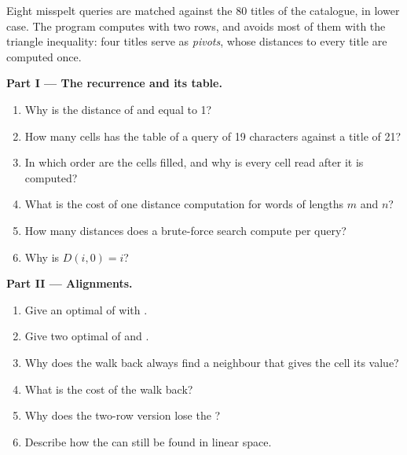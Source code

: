 \begin{problem}\label{pb:b1:dynamic-programming:1}
Eight misspelt queries are matched against the 80 titles of the catalogue, in lower case. The program computes  with two rows, and avoids most of them with the triangle inequality: four titles serve as \emph{pivots},
whose distances to every title are computed once.
\label{lst:b1:dynamic-programming:spell}
\label{out:b1:dynamic-programming:spell}

\medskip\noindent\textbf{Part I --- The recurrence and its table.}
\begin{enumerate}
\item Why is the distance of  and  equal to 1?
\item How many cells has the table of a query of 19 characters against a title of 21?
\item In which order are the cells filled, and why is every cell read after it is computed?
\item What is the cost of one distance computation for words of lengths $m$ and $n$?
\item How many distances does a brute-force search compute per query?
\item Why is $D(i, 0) = i$?
\end{enumerate}

\medskip\noindent\textbf{Part II --- Alignments.}
\begin{enumerate}[resume]
\item Give an optimal  of  with .
\item Give two optimal  of  and .
\item Why does the walk back always find a neighbour that gives the cell its value?
\item What is the cost of the walk back?
\item Why does the two-row version lose the ?
\item Describe how the  can still be found in linear space.
\end{enumerate}


\end{problem}
